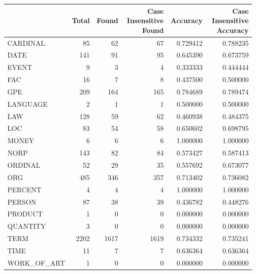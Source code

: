 \begin{tabular}{lrrrrr}
\toprule
 & Total & Found & Case Insensitive Found & Accuracy & Case Insensitive Accuracy \\
\midrule
CARDINAL & 85 & 62 & 67 & 0.729412 & 0.788235 \\
DATE & 141 & 91 & 95 & 0.645390 & 0.673759 \\
EVENT & 9 & 3 & 4 & 0.333333 & 0.444444 \\
FAC & 16 & 7 & 8 & 0.437500 & 0.500000 \\
GPE & 209 & 164 & 165 & 0.784689 & 0.789474 \\
LANGUAGE & 2 & 1 & 1 & 0.500000 & 0.500000 \\
LAW & 128 & 59 & 62 & 0.460938 & 0.484375 \\
LOC & 83 & 54 & 58 & 0.650602 & 0.698795 \\
MONEY & 6 & 6 & 6 & 1.000000 & 1.000000 \\
NORP & 143 & 82 & 84 & 0.573427 & 0.587413 \\
ORDINAL & 52 & 29 & 35 & 0.557692 & 0.673077 \\
ORG & 485 & 346 & 357 & 0.713402 & 0.736082 \\
PERCENT & 4 & 4 & 4 & 1.000000 & 1.000000 \\
PERSON & 87 & 38 & 39 & 0.436782 & 0.448276 \\
PRODUCT & 1 & 0 & 0 & 0.000000 & 0.000000 \\
QUANTITY & 3 & 0 & 0 & 0.000000 & 0.000000 \\
TERM & 2202 & 1617 & 1619 & 0.734332 & 0.735241 \\
TIME & 11 & 7 & 7 & 0.636364 & 0.636364 \\
WORK_OF_ART & 1 & 0 & 0 & 0.000000 & 0.000000 \\
\bottomrule
\end{tabular}
